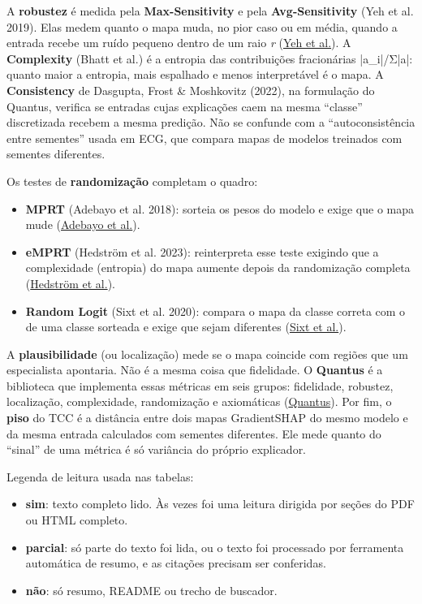 \documentclass[11pt,a4paper]{article}
\begin{document}
A \textbf{robustez} é medida pela \textbf{Max-Sensitivity} e pela \textbf{Avg-Sensitivity} (Yeh et al. 2019). Elas medem quanto o mapa muda, no pior caso ou em média, quando a entrada recebe um ruído pequeno dentro de um raio \textit{r} (\href{https://arxiv.org/abs/1901.09392}{Yeh et al.}). A \textbf{Complexity} (Bhatt et al.) é a entropia das contribuições fracionárias |a\_i|/Σ|a|: quanto maior a entropia, mais espalhado e menos interpretável é o mapa. A \textbf{Consistency} de Dasgupta, Frost \& Moshkovitz (2022), na formulação do Quantus, verifica se entradas cujas explicações caem na mesma ``classe'' discretizada recebem a mesma predição. Não se confunde com a ``autoconsistência entre sementes'' usada em ECG, que compara mapas de modelos treinados com sementes diferentes.

Os testes de \textbf{randomização} completam o quadro:

\begin{itemize}
\item \textbf{MPRT} (Adebayo et al. 2018): sorteia os pesos do modelo e exige que o mapa mude (\href{https://arxiv.org/abs/1810.03292}{Adebayo et al.}).
\item \textbf{eMPRT} (Hedström et al. 2023): reinterpreta esse teste exigindo que a complexidade (entropia) do mapa aumente depois da randomização completa (\href{https://arxiv.org/abs/2401.06465}{Hedström et al.}).
\item \textbf{Random Logit} (Sixt et al. 2020): compara o mapa da classe correta com o de uma classe sorteada e exige que sejam diferentes (\href{https://arxiv.org/abs/1912.09818}{Sixt et al.}).
\end{itemize}

A \textbf{plausibilidade} (ou localização) mede se o mapa coincide com regiões que um especialista apontaria. Não é a mesma coisa que fidelidade. O \textbf{Quantus} é a biblioteca que implementa essas métricas em seis grupos: fidelidade, robustez, localização, complexidade, randomização e axiomáticas (\href{https://github.com/understandable-machine-intelligence-lab/Quantus}{Quantus}). Por fim, o \textbf{piso} do TCC é a distância entre dois mapas GradientSHAP do mesmo modelo e da mesma entrada calculados com sementes diferentes. Ele mede quanto do ``sinal'' de uma métrica é só variância do próprio explicador.

Legenda de leitura usada nas tabelas:

\begin{itemize}
\item \textbf{sim}: texto completo lido. Às vezes foi uma leitura dirigida por seções do PDF ou HTML completo.
\item \textbf{parcial}: só parte do texto foi lida, ou o texto foi processado por ferramenta automática de resumo, e as citações precisam ser conferidas.
\item \textbf{não}: só resumo, README ou trecho de buscador.
\end{itemize}
\end{document}
